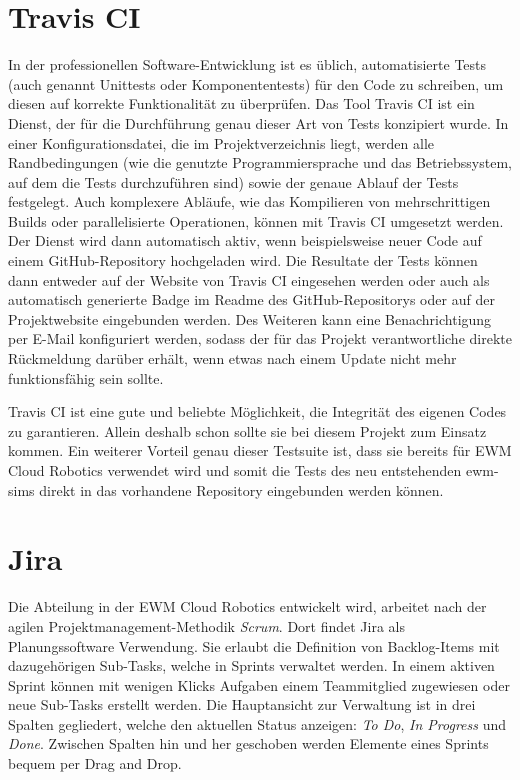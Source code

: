 \section{Travis CI}
In der professionellen Software-Entwicklung ist es üblich, automatisierte Tests (auch genannt Unittests oder Komponententests) für den Code zu schreiben, um diesen auf korrekte Funktionalität zu überprüfen.
Das Tool Travis CI ist ein Dienst, der für die Durchführung genau dieser Art von Tests konzipiert wurde.
In einer Konfigurationsdatei, die im Projektverzeichnis liegt, werden alle Randbedingungen (wie die genutzte Programmiersprache und das Betriebssystem, auf dem die Tests durchzuführen sind) sowie der genaue Ablauf der Tests festgelegt.
Auch komplexere Abläufe, wie das Kompilieren von mehrschrittigen Builds oder parallelisierte Operationen, können mit Travis CI umgesetzt werden.
Der Dienst wird dann automatisch aktiv, wenn beispielsweise neuer Code auf einem GitHub-Repository hochgeladen wird.
Die Resultate der Tests können dann entweder auf der Website von Travis CI eingesehen werden oder auch als automatisch generierte Badge im Readme des GitHub-Repositorys oder auf der Projektwebsite eingebunden werden.
Des Weiteren kann eine Benachrichtigung per E-Mail konfiguriert werden, sodass der für das Projekt verantwortliche direkte Rückmeldung darüber erhält, wenn etwas nach einem Update nicht mehr funktionsfähig sein sollte.

Travis CI ist eine gute und beliebte Möglichkeit, die Integrität des eigenen Codes zu garantieren.
Allein deshalb schon sollte sie bei diesem Projekt zum Einsatz kommen.
Ein weiterer Vorteil genau dieser Testsuite ist, dass sie bereits für \ac{EWM} Cloud Robotics verwendet wird und somit die Tests des neu entstehenden \ac{ewm-sim}s direkt in das vorhandene Repository eingebunden werden können.

\section{Jira}
Die Abteilung in der \ac{EWM} Cloud Robotics entwickelt wird, arbeitet nach der agilen Projektmanagement-Methodik \emph{Scrum}.
Dort findet Jira als Planungssoftware Verwendung.
Sie erlaubt die Definition von Backlog-Items mit dazugehörigen Sub-Tasks, welche in Sprints verwaltet werden.
In einem aktiven Sprint können mit wenigen Klicks Aufgaben einem Teammitglied zugewiesen oder neue Sub-Tasks erstellt werden.
Die Hauptansicht zur Verwaltung ist in drei Spalten gegliedert, welche den aktuellen Status anzeigen: \emph{To Do}, \emph{In Progress} und \emph{Done}.
Zwischen Spalten hin und her geschoben werden Elemente eines Sprints bequem per Drag and Drop.